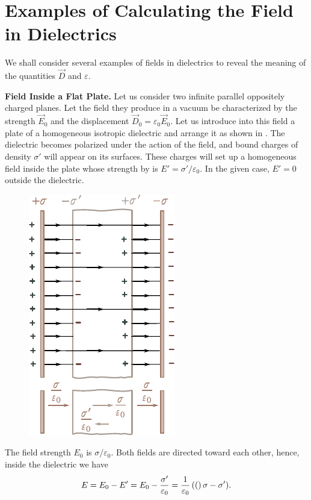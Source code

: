 \section{Examples of Calculating the Field in Dielectrics}\label{sec:2_6}

We shall consider several examples of fields in dielectrics to reveal the meaning of the quantities $\vec{D}$ and $\varepsilon$.

\textbf{Field Inside a Flat Plate.} Let us consider two infinite parallel oppositely charged planes. Let the field they produce in a vacuum be characterized by the strength $\vec{E}_0$ and the displacement $\vec{D}_0=\varepsilon_0\vec{E}_0$. Let us introduce into this field a plate of a homogeneous isotropic dielectric and arrange it as shown in . The dielectric becomes polarized under the action of the field, and bound charges of density $\sigma'$ will appear on its surfaces. These charges will set up a homogeneous field inside the plate whose strength by  is $E'=\sigma'/\varepsilon_0$. In the given case, $E'=0$ outside the dielectric.

\begin{figure}[t]
	\begin{center}
		\includegraphics[scale=1]{figures/ch_02/fig_2_5.pdf}
		\caption[]{}
		\label{fig:2_5}
	\end{center}
	\vspace{-0.8cm}
\end{figure}

The field strength $E_0$ is $\sigma/\varepsilon_0$. Both fields are directed toward each other, hence, inside the dielectric we have
\begin{equation}\label{eq:2_32}
    E = E_0 - E' = E_0 - \frac{\sigma'}{\varepsilon_0} = \frac{1}{\varepsilon_0}\left((\right)\sigma - \sigma').
\end{equation}

